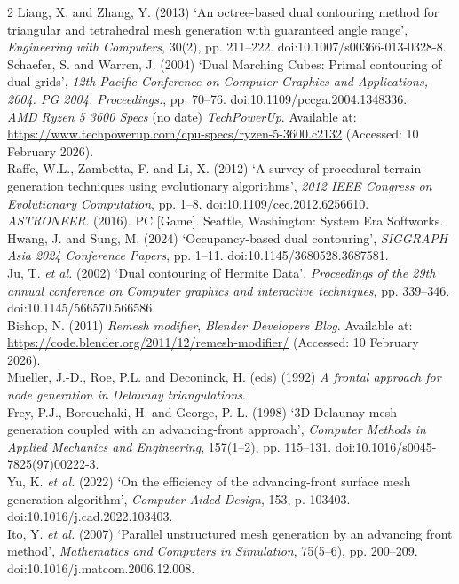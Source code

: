 \documentclass[]{article}
\begin{document}
\begin{multicols}{2}
Liang, X. and Zhang, Y. (2013) `An octree-based dual contouring method for triangular and tetrahedral mesh generation with guaranteed angle range', \emph{Engineering with Computers}, 30(2), pp. 211--222. doi:10.1007/s00366-013-0328-8.\medskip\\
Schaefer, S. and Warren, J. (2004) `Dual Marching Cubes: Primal contouring of dual grids', \emph{12th Pacific Conference on Computer Graphics and Applications, 2004. PG 2004. Proceedings.}, pp. 70--76. doi:10.1109/pccga.2004.1348336.\medskip\\
\emph{AMD Ryzen 5 3600 Specs} (no date) \emph{TechPowerUp}. Available at: \url{https://www.techpowerup.com/cpu-specs/ryzen-5-3600.c2132} (Accessed: 10 February 2026).\medskip\\
Raffe, W.L., Zambetta, F. and Li, X. (2012) `A survey of procedural terrain generation techniques using evolutionary algorithms', \emph{2012 IEEE Congress on Evolutionary Computation}, pp. 1--8. doi:10.1109/cec.2012.6256610.\medskip\\
\emph{ASTRONEER}. (2016). PC {[}Game{]}. Seattle, Washington: System Era Softworks.\medskip\\
Hwang, J. and Sung, M. (2024) `Occupancy-based dual contouring', \emph{SIGGRAPH Asia 2024 Conference Papers}, pp. 1--11. doi:10.1145/3680528.3687581.\medskip\\
Ju, T. \emph{et al.} (2002) `Dual contouring of Hermite Data', \emph{Proceedings of the 29th annual conference on Computer graphics and interactive techniques}, pp. 339--346. doi:10.1145/566570.566586.\medskip\\
Bishop, N. (2011) \emph{Remesh modifier}, \emph{Blender Developers Blog}. Available at: \url{https://code.blender.org/2011/12/remesh-modifier/} (Accessed: 10 February 2026).\medskip\\
Mueller, J.-D., Roe, P.L. and Deconinck, H. (eds) (1992) \emph{A frontal approach for node generation in Delaunay triangulations}.\medskip\\
Frey, P.J., Borouchaki, H. and George, P.-L. (1998) `3D Delaunay mesh generation coupled with an advancing-front approach', \emph{Computer Methods in Applied Mechanics and Engineering}, 157(1--2), pp. 115--131. doi:10.1016/s0045-7825(97)00222-3.\medskip\\
Yu, K. \emph{et al.} (2022) `On the efficiency of the advancing-front surface mesh generation algorithm', \emph{Computer-Aided Design}, 153, p. 103403. doi:10.1016/j.cad.2022.103403.\medskip\\
Ito, Y. \emph{et al.} (2007) `Parallel unstructured mesh generation by an advancing front method', \emph{Mathematics and Computers in Simulation}, 75(5--6), pp. 200--209. doi:10.1016/j.matcom.2006.12.008.\medskip\\

\end{multicols}
\end{document}
